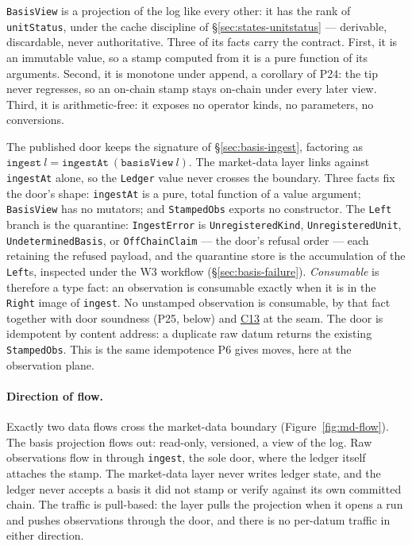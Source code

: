 \texttt{BasisView} is a projection of the log like every other: it has the rank
of \texttt{unitStatus}, under the cache discipline of
\S\ref{sec:states-unitstatus} --- derivable, discardable, never authoritative.
Three of its facts carry the contract. First, it is an immutable value, so a
stamp computed from it is a pure function of its arguments. Second, it is
monotone under append, a corollary of P24: the tip never regresses, so an
on-chain stamp stays on-chain under every later view. Third, it is
arithmetic-free: it exposes no operator kinds, no parameters, no conversions.

The published door keeps the signature of \S\ref{sec:basis-ingest}, factoring as
$\texttt{ingest}\ l=\texttt{ingestAt}\ (\texttt{basisView}\ l)$. The market-data
layer links against \texttt{ingestAt} alone, so the \texttt{Ledger} value never
crosses the boundary. Three facts fix the door's shape: \texttt{ingestAt} is a
pure, total function of a value argument; \texttt{BasisView} has no mutators;
and \texttt{StampedObs} exports no constructor. The \texttt{Left} branch is the
quarantine: \texttt{IngestError} is \texttt{UnregisteredKind},
\texttt{UnregisteredUnit}, \texttt{UndeterminedBasis}, or \texttt{OffChainClaim} ---
the door's refusal order --- each retaining the
refused payload, and the quarantine store is the accumulation of the
\texttt{Left}s, inspected under the W3 workflow (\S\ref{sec:basis-failure}).
\emph{Consumable} is therefore a type fact: an observation is consumable exactly
when it is in the \texttt{Right} image of \texttt{ingest}. No unstamped
observation is consumable, by that fact together with door soundness (P25,
below) and \hyperref[cond:C13]{C13} at the seam. The door is idempotent by
content address: a duplicate raw datum returns the existing \texttt{StampedObs}.
This is the same idempotence P6 gives moves, here at the observation plane.

\paragraph{Direction of flow.} Exactly two data flows cross the market-data
boundary (Figure~\ref{fig:md-flow}). The basis projection flows out: read-only,
versioned, a view of the log. Raw observations flow in through \texttt{ingest},
the sole door, where the ledger itself attaches the stamp. The market-data layer
never writes ledger state, and the ledger never accepts a basis it did not stamp
or verify against its own committed chain. The traffic is pull-based: the layer
pulls the projection when it opens a run and pushes observations through the
door, and there is no per-datum traffic in either direction.

